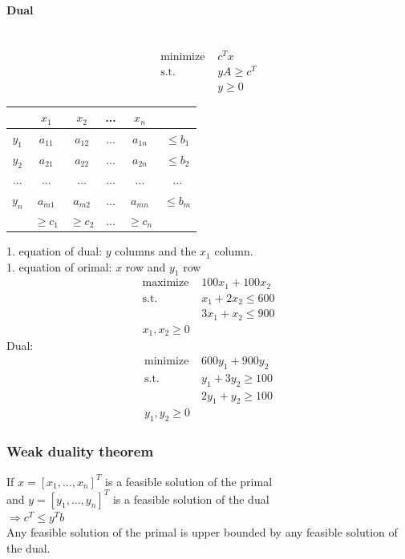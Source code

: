\paragraph{Dual} ~ \\
\begin{align*}
\text{minimize } &c^Tx \\
\text{s.t. } & yA \geq c^T \\
& y \geq 0
\end{align*}
\begin{center}
\begin{tabular}{c|cccc|c}
& $x_1$ & $x_2$ & ... & $x_n$ & \\ \hline 
$y_1$ & $a_{11}$ & $a_{12}$ & ... & $a_{1n}$ & $\leq b_1$ \\
$y_2$ & $a_{21}$ & $a_{22}$ & ... & $a_{2n}$ & $\leq b_2$ \\
... & ... & ... &...& ...& ... \\
$y_n$ & $a_{m1}$ & $a_{m2}$ & ... & $a_{mn}$ & $\leq b_m$ \\ \hline 
& $\geq c_1$ & $\geq c_2$ & ... & $\geq c_n$ & \\
\end{tabular} 
\end{center}
1. equation of dual: $y$ columns and the $x_1$ column. \\
1. equation of orimal: $x$ row and $y_1$ row
\begin{align*}
\text{maximize } &100x_1 + 100x_2 \\
\text{s.t. } &x_1+2x_2 \leq 600 \\
&3x_1+x_2 \leq 900 \\
x_1,x_2 \geq 0
\end{align*}
Dual:
\begin{align*}
\text{minimize } &600y_1+900y_2 \\
\text{s.t. } &y_1+3y_2 \geq 100 \\
&2y_1+y_2\geq 100 \\
y_1,y_2 \geq 0 
\end{align*}

\subsubsection{Weak duality theorem}
If $x = [x_1,...,x_n]^T$ is a feasible solution of the primal \\
and $y = [y_1,...,y_n]^T$ is a feasible solution of the dual \\
$\Rightarrow c^T \leq y^Tb$ \\
Any feasible solution of the primal is upper bounded by any feasible solution of the dual.
